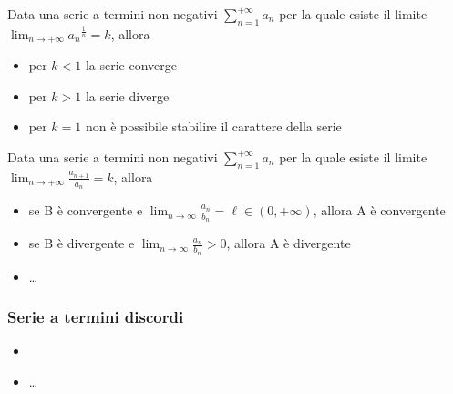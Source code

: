 \documentclass[letterpaper,10pt,italian]{jupyterBook}
\begin{document}
\sphinxAtStartPar
{} Data una serie a termini non negativi \(\sum_{n=1}^{+\infty} a_n\) per la quale esiste il limite \(\lim_{n \rightarrow +\infty} {a_n}^{\frac{1}{n}} = k\), allora
\begin{itemize}
\item {} 
\sphinxAtStartPar
per \(k < 1\) la serie converge

\item {} 
\sphinxAtStartPar
per \(k > 1\) la serie diverge

\item {} 
\sphinxAtStartPar
per \(k = 1\) non è possibile stabilire il carattere della serie

\end{itemize}

\sphinxAtStartPar
{} Data una serie a termini non negativi \(\sum_{n=1}^{+\infty} a_n\) per la quale esiste il limite \(\lim_{n \rightarrow +\infty} \frac{a_{n+1}}{a_n} = k\), allora
\begin{itemize}
\item {} 
\sphinxAtStartPar
se B è convergente e \(\lim_{n \rightarrow \infty} \frac{a_n}{b_n} = \ell \in (0, +\infty)\), allora A è convergente

\item {} 
\sphinxAtStartPar
se B è  divergente e \(\lim_{n \rightarrow \infty} \frac{a_n}{b_n} > 0\), allora A è  divergente

\end{itemize}

\sphinxAtStartPar
{}

\sphinxAtStartPar
{}
\begin{itemize}
\item {} 
\sphinxAtStartPar
…

\end{itemize}

\sphinxAtStartPar
{}


\subsubsection{Serie a termini discordi}
\label{\detokenize{ch/series:serie-a-termini-discordi}}\begin{itemize}
\item {} 
\sphinxAtStartPar
{}

\item {} 
\sphinxAtStartPar
…

\end{itemize}
\end{document}
